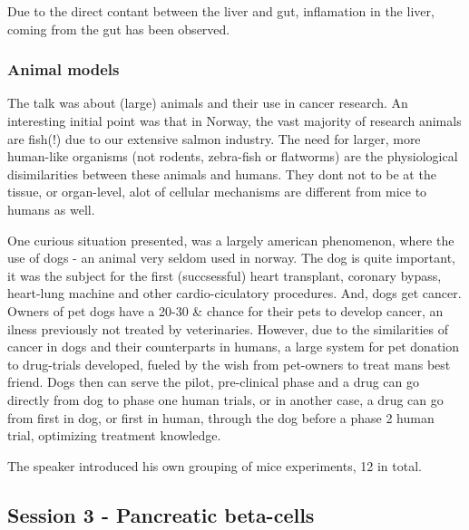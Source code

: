 \documentclass[12p]{article}
\begin{document}
Due to the direct contant between the liver and gut, inflamation in the liver, coming from the gut has been observed.

\subsubsection{Animal models}

The talk was about (large) animals and their use in cancer research.
An interesting initial point was that in Norway, the vast majority of research animals are fish(!) due to our extensive salmon industry.
The need for larger, more human-like organisms (not rodents, zebra-fish or flatworms) are the physiological disimilarities between these animals and humans.
They dont not to be at the tissue, or organ-level, alot of cellular mechanisms are different from mice to humans as well.

One curious situation presented, was a largely american phenomenon, where the use of dogs - an animal very seldom used in norway.
The dog is quite important, it was the subject for the first (succsessful) heart transplant, coronary bypass, heart-lung machine and other cardio-ciculatory procedures.
And, dogs get cancer.
Owners of pet dogs have a 20-30 \& chance for their pets to develop cancer, an ilness previously not treated by veterinaries.
However, due to the similarities of cancer in dogs and their counterparts in humans, a large system for pet donation to drug-trials developed, fueled by the wish from pet-owners to treat mans best friend.
Dogs then can serve the pilot, pre-clinical phase and a drug can go directly from dog to phase one human trials, or in another case, a drug can go from first in dog, or first in human, through the dog before a phase 2 human trial, optimizing treatment knowledge.

The speaker introduced his own grouping of mice experiments, 12 in total.

\subsection*{Session 3 - Pancreatic beta-cells}
\end{document}
